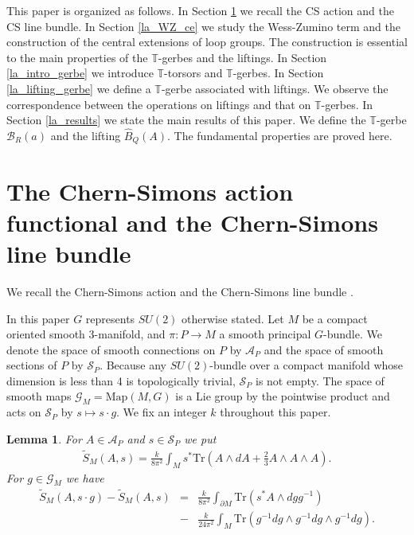 \documentclass[a4paper,a4paper]{article}
\newtheorem{lem}[thm]{Lemma}
\theoremstyle{definition}
\theoremstyle{remark}
\newcommand{\T}{\mathbb{T}}
\newcommand{\A}{\mathcal{A}}
\newcommand{\B}{\mathcal{B}}
\newcommand{\G}{\mathcal{G}}
\newcommand{\Tr}{\mathrm{Tr}}
\renewcommand{\S}{\mathcal{S}}
\def\h#1{ \widehat{#1} }
\def\M#1{ \mathrm{Map}({#1},G) }
\begin{document}
\medskip

This paper is organized as follows. In Section \ref{la_CSaction_CSlinebundle} we recall the CS action and the CS line bundle. In Section \ref{la_WZ_ce} we study the Wess-Zumino term and the construction of the central extensions of loop groups. The construction is essential to the main properties of the $\T$-gerbes and the liftings. In Section \ref{la_intro_gerbe} we introduce $\T$-torsors and $\T$-gerbes. In Section \ref{la_lifting_gerbe} we define a $\T$-gerbe associated with liftings. We observe the correspondence between the operations on liftings and that on $\T$-gerbes. In Section \ref{la_results} we state the main results of this paper. We define the $\T$-gerbe $\B_R(a)$ and the lifting $\h{B}_Q(A)$. The fundamental properties are proved here.



\section{The Chern-Simons action functional and the Chern-Simons line bundle}
\label{la_CSaction_CSlinebundle}

We recall the Chern-Simons action and the Chern-Simons line bundle \cite{F1, R-S-W, W}. 

\smallskip

In this paper $G$ represents $SU(2)$ otherwise stated. Let $M$ be a compact oriented smooth 3-manifold, and $\pi : P \to M$ a smooth principal $G$-bundle. We denote the space of smooth connections on $P$ by $\A_P$ and the space of smooth sections of $P$ by $\S_P$. Because any $SU(2)$-bundle over a compact manifold whose dimension is less than 4 is topologically trivial, $\S_P$ is not empty. The space of smooth maps $\G_M = \M{M}$ is a Lie group by the pointwise product and acts on $\S_P$ by $s \mapsto s \cdot g$. We fix an integer $k$ throughout this paper.

\begin{lem}
For $A \in \A_P$ and $s \in \S_P$ we put
\begin{eqnarray}
\tilde{S}_M(A,s) = \frac{k}{8\pi^2} \int_M 
s^* \Tr \left( A \wedge dA + \frac{2}{3} A \wedge A \wedge A \right) .
\end{eqnarray}
For $g \in \G_M$ we have
\begin{eqnarray} 
\tilde{S}_M(A,s \cdot g) - \tilde{S}_M(A,s) 
& = & 
\frac{k}{8\pi^2} \int_{\partial M} \Tr(s^*A \wedge dg g^{-1})
\label{difference_CS} \\
& - &
\frac{k}{24\pi^2} \int_M \Tr(g^{-1}dg \wedge g^{-1}dg \wedge g^{-1}dg) .
\nonumber
\end{eqnarray}
\end{lem}
\end{document}
